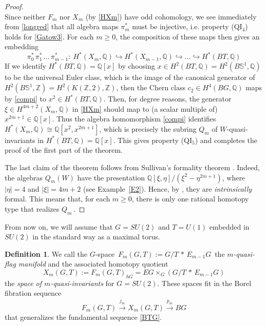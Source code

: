 \documentclass[11pt]{amsart}
\theoremstyle{definition}
\newtheorem{defi}[theorem]{Definition}
\theoremstyle{remark}
\numberwithin{equation}{section}
\newcommand{\la}{\label}
\newcommand{\into}{\hookrightarrow}
\def\bS{\mathbb S}
\def\Z{\mathbb{Z}}
\def\Q{\mathbb{Q}}
\begin{document}
\begin{proof}
\begin{equation}
\end{equation}
%
Since neither $ F_m $ nor $ X_m $ (by \eqref{HXm}) have odd cohomology, we see
immediately from \eqref{longred} that all algebra maps $ \pi_m^* $ must be injective,
i.e. property (QI$_{4}$) holds for \eqref{Gatow3}. For each $m \ge 0 $, the composition of these maps
then gives an embedding
%
\begin{equation}
\la{compi}
\pi^*_0 \,\pi^*_1 \, \ldots\,\pi_{m-1}^*:\   H^*(X_m, \Q) \into H^*(X_{m-1}, \Q) \into \ldots \into H^*(BT, \Q)
\end{equation}
% 
If we identify $ H^*(BT, \Q) = \Q[x] $ by choosing  $ x \in H^2(BT, \Q) = H^2(B\bS^1, \Q)$ to be the universal Euler class, which is the image of the canonical generator of $ H^2(B\bS^1, \Z) = H^2(K(\Z, 2), \Z)$, then the Chern class $ c_2 \in H^4(BG, \Q) $ maps by \eqref{compi} to $x^2 \in H^*(BT, \Q) $. Then, for degree reasons, the generator $ \xi \in H^{4m+2}(X_m, \Q) $
in \eqref{HXm} should map to (a scalar multiple of)  $ x^{2m+1} \in \Q[x] $.
Thus the algebra homomorphism \eqref{compi} identifies $ H^*(X_m, \Q) \cong \Q[x^2, x^{2m+1}] $, which 
is precisely the subring $Q_m$ of $W$-quasi-invariants in $ H^*(BT, \Q) = \Q[x] $. 
This gives property (QI$_{5}$) and completes the proof of the first part of the theorem.

The last claim of the theorem follows from Sullivan's formality theorem \cite{Su77}. Indeed, the algebras $ Q_m(W) $ have the presentation $ \Q[\xi, \eta]/(\xi^2 -  \eta^{2m+1})$, where $|\eta|= 4$ and $|\xi| = 4m+2$ (see Example~\ref{E2}). Hence, by \cite[Remark (v), p. 317]{Su77}, they are {\it intrinsically} formal. This means that, for each $ m\ge 0 $, there is only one rational homotopy type that realizes $Q_m\,$.
\end{proof}
%

From now on, we will assume that $ G = SU(2) $ and $ T = U(1) $ embedded in $SU(2)$ in the standard way as a maximal torus.
%
\begin{defi}
\la{qspaces}
We call the $G$-space $\, F_m(G,T) := G/T \,\ast\, E_{m-1} G \,$  the {\it $m$-quasi-flag manifold} and the associated homotopy quotient 
$$ 
X_m(G,T) := F_m(G,T)_{hG} = EG \times_G(G/T \,\ast \,E_{m-1}G) 
$$ 
the {\it space of $m$-quasi-invariants}  for $ G = SU(2) $. These spaces fit in the Borel fibration sequence 
%
\begin{equation}
\la{borfib}
F_m(G,T) \xrightarrow{j_m} X_m(G,T) \xrightarrow{p_m} BG 
\end{equation}
that generalizes the fundamental sequence \eqref{BTG}.
\end{defi}
%
\end{document}
